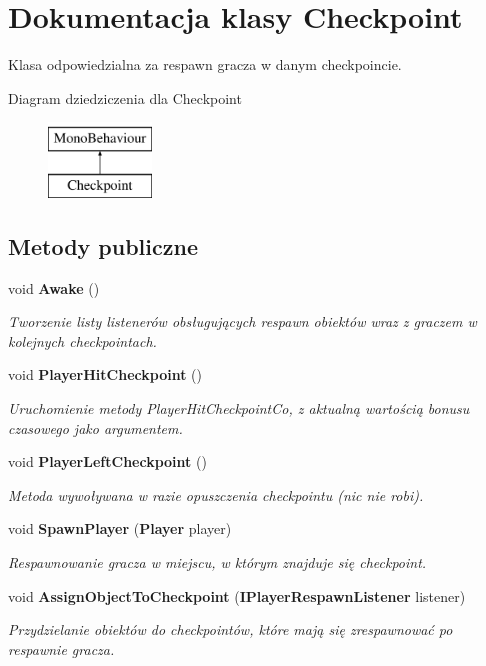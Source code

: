\section{Dokumentacja klasy Checkpoint}
\label{class_checkpoint}


Klasa odpowiedzialna za respawn gracza w danym checkpoincie.  


Diagram dziedziczenia dla Checkpoint\begin{figure}[H]
\begin{center}
\leavevmode
\includegraphics[height=2.000000cm]{class_checkpoint}
\end{center}
\end{figure}
\subsection*{Metody publiczne}
\begin{DoxyCompactItemize}
\item 
void {\bf Awake} ()
\begin{DoxyCompactList}\small\item\em Tworzenie listy listenerów obsługujących respawn obiektów wraz z graczem w kolejnych checkpointach. \end{DoxyCompactList}\item 
void {\bf Player\+Hit\+Checkpoint} ()
\begin{DoxyCompactList}\small\item\em Uruchomienie metody Player\+Hit\+Checkpoint\+Co, z aktualną wartością bonusu czasowego jako argumentem. \end{DoxyCompactList}\item 
void {\bf Player\+Left\+Checkpoint} ()
\begin{DoxyCompactList}\small\item\em Metoda wywoływana w razie opuszczenia checkpointu (nic nie robi). \end{DoxyCompactList}\item 
void {\bf Spawn\+Player} ({\bf Player} player)
\begin{DoxyCompactList}\small\item\em Respawnowanie gracza w miejscu, w którym znajduje się checkpoint. \end{DoxyCompactList}\item 
void {\bf Assign\+Object\+To\+Checkpoint} ({\bf I\+Player\+Respawn\+Listener} listener)
\begin{DoxyCompactList}\small\item\em Przydzielanie obiektów do checkpointów, które mają się zrespawnować po respawnie gracza. \end{DoxyCompactList}\end{DoxyCompactItemize}


